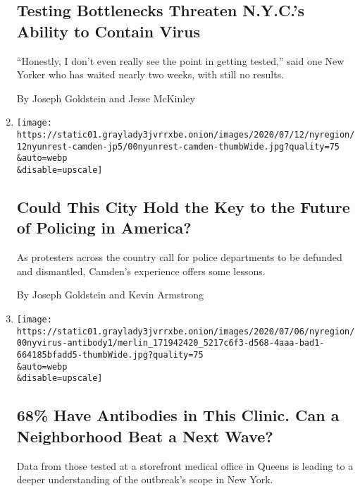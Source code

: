 \begin{enumerate}
{  \subsection{Testing Bottlenecks Threaten N.Y.C.'s Ability to Contain
  Virus}\label{testing-bottlenecks-threaten-nycs-ability-to-contain-virus}}

  ``Honestly, I don't even really see the point in getting tested,''
  said one New Yorker who has waited nearly two weeks, with still no
  results.

  By Joseph Goldstein and Jesse McKinley
\item
  \href{/2020/07/12/nyregion/camden-police.html}{}

  \texttt{[image: https://static01.graylady3jvrrxbe.onion/images/2020/07/12/nyregion/12nyunrest-camden-jp5/00nyunrest-camden-thumbWide.jpg?quality=75\\\&auto=webp\\\&disable=upscale]}

  \hypertarget{could-this-city-hold-the-key-to-the-future-of-policing-in-america}{%
  \subsection{Could This City Hold the Key to the Future of Policing in
  America?}\label{could-this-city-hold-the-key-to-the-future-of-policing-in-america}}

  As protesters across the country call for police departments to be
  defunded and dismantled, Camden's experience offers some lessons.

  By Joseph Goldstein and Kevin Armstrong
\item
  \href{/2020/07/09/nyregion/nyc-coronavirus-antibodies.html}{}

  \texttt{[image: https://static01.graylady3jvrrxbe.onion/images/2020/07/06/nyregion/00nyvirus-antibody1/merlin\_171942420\_5217c6f3-d568-4aaa-bad1-664185bfadd5-thumbWide.jpg?quality=75\\\&auto=webp\\\&disable=upscale]}

  \hypertarget{68-have-antibodies-in-this-clinic-can-a-neighborhood-beat-a-next-wave}{%
  \subsection{68\% Have Antibodies in This Clinic. Can a Neighborhood
  Beat a Next
  Wave?}\label{68-have-antibodies-in-this-clinic-can-a-neighborhood-beat-a-next-wave}}

  Data from those tested at a storefront medical office in Queens is
  leading to a deeper understanding of the outbreak's scope in New York.


\end{enumerate}
